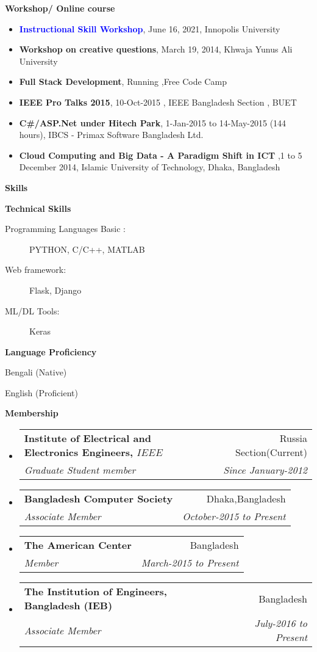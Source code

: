 \documentclass[letterpaper,10pt]{article}
\makeatletter
\newcommand{\resitem}[1]{\item #1 \vspace{-2pt}}
\newcommand{\resheading}[1]{{\large \colorbox{mygrey}{\begin{minipage}{\textwidth}{\textbf{#1 \vphantom{p\^{E}}}}\end{minipage}}}}
\newcommand{\ressubheading}[4]{
\begin{tabular*}{6.5in}{l@{\extracolsep{\fill}}r}
		\textbf{#1} & #2 \\
		\textit{#3} & \textit{#4} \\
\end{tabular*}\vspace{-6pt}}
\makeatother
\begin{document}
\resheading{Workshop/ Online course }
\begin{itemize}
\resitem{\textcolor{blue}{\textbf{Instructional Skill Workshop}}, June 16, 2021, Innopolis University}

\resitem{\textbf{Workshop on creative questions}, March 19, 2014, Khwaja Yunus Ali University }
\resitem{\textbf{Full Stack Development}, Running ,Free Code Camp}
\resitem{\textbf{IEEE Pro Talks 2015}, 10-Oct-2015 , IEEE Bangladesh Section , BUET }
\resitem{\textbf{C\#/ASP.Net under Hitech Park}, 1-Jan-2015 to 14-May-2015 (144 hours), IBCS - Primax Software
Bangladesh Ltd.}
\resitem{\textbf{Cloud Computing and Big Data - A Paradigm Shift in ICT} ,1 to 5 December 2014, Islamic University of Technology, Dhaka, Bangladesh}
\end{itemize}






\resheading{Skills}

\begin{description}
\item
\resitem{\textbf{Technical Skills}}
\begin{description}
\item[Programming Languages Basic :] PYTHON, C/C++, MATLAB
\item[Web framework:] Flask, Django
\item[ML/DL Tools:] Keras 

\end{description}
\item
\resitem{\textbf{Language Proficiency}}
\begin{description}
\item{Bengali (Native)}
\item{English (Proficient)}
\end{description}
\end{description}

 \resheading{Membership}
 \begin{itemize}
 \item
 \ressubheading{Institute of Electrical and Electronics Engineers, \(IEEE\)}{Russia Section(Current)}{Graduate Student member}{Since January-2012}


 \item
 \ressubheading{Bangladesh Computer Society}{Dhaka,Bangladesh }{Associate Member}{October-2015 to Present}
 \item
 \ressubheading{The American Center}{Bangladesh}{Member}{March-2015 to Present }
 \item
 \ressubheading{ The Institution of Engineers, Bangladesh (IEB)}{Bangladesh}{Associate Member}{July-2016 to Present }

 \end{itemize}
\end{document}
